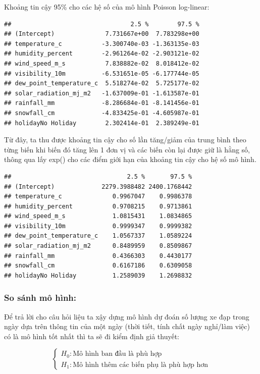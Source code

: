 \documentclass[
  11pt,
  letterpaper,
]{article}
\begin{document}
Khoảng tin cậy 95\% cho các hệ số của mô hình Poisson log-linear:

\begin{verbatim}
##                                 2.5 %        97.5 %
## (Intercept)              7.731667e+00  7.783298e+00
## temperature_c           -3.300740e-03 -1.363135e-03
## humidity_percent        -2.961264e-02 -2.903121e-02
## wind_speed_m_s           7.838882e-02  8.018412e-02
## visibility_10m          -6.531651e-05 -6.177744e-05
## dew_point_temperature_c  5.518274e-02  5.725177e-02
## solar_radiation_mj_m2   -1.637009e-01 -1.613587e-01
## rainfall_mm             -8.286684e-01 -8.141456e-01
## snowfall_cm             -4.833425e-01 -4.605987e-01
## holidayNo Holiday        2.302414e-01  2.389249e-01
\end{verbatim}

Từ đây, ta thu được khoảng tin cậy cho số lần tăng/giảm của trung bình theo từng biến khi biến đó tăng lên 1 đơn vị và các biến còn lại được giữ là hằng số, thông qua lấy exp() cho các điểm giới hạn của khoảng tin cậy cho hệ số mô hình.

\begin{verbatim}
##                                2.5 %       97.5 %
## (Intercept)             2279.3988482 2400.1768442
## temperature_c              0.9967047    0.9986378
## humidity_percent           0.9708215    0.9713861
## wind_speed_m_s             1.0815431    1.0834865
## visibility_10m             0.9999347    0.9999382
## dew_point_temperature_c    1.0567337    1.0589224
## solar_radiation_mj_m2      0.8489959    0.8509867
## rainfall_mm                0.4366303    0.4430177
## snowfall_cm                0.6167186    0.6309058
## holidayNo Holiday          1.2589039    1.2698832
\end{verbatim}

\subsubsection{So sánh mô hình:}

Để trả lời cho câu hỏi liệu ta xậy dựng mô hình dự đoán số lượng xe đạp trong ngày dựa trên thông tin của một ngày (thời tiết, tính chất ngày nghỉ/làm việc) có là mô hình tốt nhất thì ta sẽ đi kiểm định giả thuyết:

$$\begin{cases}
H_0 : \text{Mô hình ban đầu là phù hợp} \\
H_1 : \text{Mô hình thêm các biến phụ là phù hợp hơn}
\end{cases}$$
\end{document}
